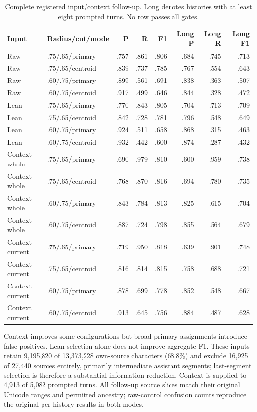 \documentclass[11pt]{article}
\begin{document}
\begin{table}[ht]
\centering\small
\begin{tabular}{llrrrrrr}
\toprule
Input & Radius/cut/mode & P & R & F1 & Long P & Long R & Long F1 \\
\midrule
Raw & .75/.65/primary & .757 & .861 & .806 & .684 & .745 & .713 \\
Raw & .75/.65/centroid & .839 & .737 & .785 & .767 & .554 & .643 \\
Raw & .60/.75/primary & .899 & .561 & .691 & .838 & .363 & .507 \\
Raw & .60/.75/centroid & .917 & .499 & .646 & .844 & .328 & .472 \\
Lean & .75/.65/primary & .770 & .843 & .805 & .704 & .713 & .709 \\
Lean & .75/.65/centroid & .842 & .728 & .781 & .796 & .548 & .649 \\
Lean & .60/.75/primary & .924 & .511 & .658 & .868 & .315 & .463 \\
Lean & .60/.75/centroid & .932 & .442 & .600 & .874 & .287 & .432 \\
Context whole & .75/.65/primary & .690 & .979 & .810 & .600 & .959 & .738 \\
Context whole & .75/.65/centroid & .768 & .870 & .816 & .694 & .780 & .735 \\
Context whole & .60/.75/primary & .843 & .784 & .813 & .825 & .615 & .704 \\
Context whole & .60/.75/centroid & .887 & .724 & .798 & .855 & .564 & .679 \\
Context current & .75/.65/primary & .719 & .950 & .818 & .639 & .901 & .748 \\
Context current & .75/.65/centroid & .816 & .814 & .815 & .758 & .688 & .721 \\
Context current & .60/.75/primary & .878 & .699 & .778 & .852 & .548 & .667 \\
Context current & .60/.75/centroid & .913 & .645 & .756 & .884 & .487 & .628 \\
\bottomrule
\end{tabular}
\caption{Complete registered input/context follow-up. Long denotes histories
with at least eight prompted turns. No row passes all gates.}
\end{table}

Context improves some configurations but broad primary assignments introduce
false positives. Lean selection alone does not improve aggregate F1. These
inputs retain 9,195,820 of 13,373,228 own-source characters (68.8\%) and exclude
16,925 of 27,440 sources entirely, primarily intermediate assistant segments;
last-segment selection is therefore a substantial information reduction.
Context is supplied to 4,913 of 5,082 prompted turns. All follow-up source slices
match their original Unicode ranges and permitted ancestry; raw-control
confusion counts reproduce the original per-history results in both modes.
\end{document}
